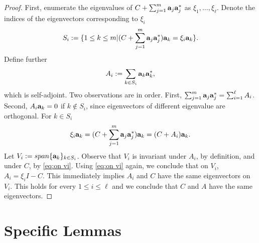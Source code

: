 \documentclass{amsart}
\numberwithin{equation}{section}
\providecommand{\DIFaddend}{} %
\begin{document}
\simdiag
\begin{proof}
  First, enumerate the eigenvalues of $C + \sum_{j=1}^m
  \mathbf{a}_j\mathbf{a}_j^*$ as $\xi_1,\dots,\xi_\ell$. Denote the
  indices of the eigenvectors corresponding to $\xi_i$
  \begin{equation*}
    S_i := \{ 1 \leq k \leq m | (C + \sum_{j=1}^m \mathbf{a}_j\mathbf{a}_j^* )\mathbf{a}_k = \xi_i \mathbf{a}_k \}.
  \end{equation*}
  Define further
  \begin{equation*}
    A_i := \sum_{k \in S_i} \mathbf{a}_k \mathbf{a}_k^*,
  \end{equation*}
  which is self-adjoint. Two observations are in order. First,
  $\sum_{j=1}^m \mathbf{a}_j\mathbf{a}_j^* = \sum_{i=1}^\ell A_i$. Second, $A_i
  \mathbf{a}_k = 0$ if $k\not \in S_i$, since eigenvectors of different
  eigenvalue are orthogonal. For $k \in S_i$
  \begin{equation}\label{eq:on vi}
    \xi_i \mathbf{a}_k = (C + \sum_{j=1}^m \mathbf{a}_j \mathbf{a}_j^* ) \mathbf{a}_k = (C + A_i) \mathbf{a}_k.
  \end{equation}
  Let $V_i := span \{\mathbf{a}_k \}_{k\in S_i}$. Observe that $V_i$ is
  invariant under $A_i$, by definition, and under $C$, by \eqref{eq:on
    vi}. Using \eqref{eq:on vi} again, we conclude that on $V_i$, $A_i
  = \xi_iI - C$. This immediately implies $A_i$ and $C$ have the
  same eigenvectors on $V_i$. This holds for every $1 \leq i \leq
  \ell$ and we conclude that $C$ and $A$ have the same eigenvectors.
\end{proof}
\DIFaddend 


\section{Specific Lemmas}
\end{document}
